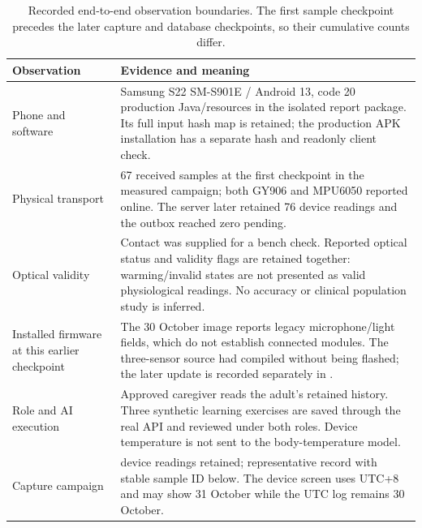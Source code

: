 \begin{table}[H]\small
\caption{Recorded end-to-end observation boundaries. The first sample checkpoint precedes the later capture and database checkpoints, so their cumulative counts differ.}\label{tab:usb-observation}
\begin{tabularx}{\textwidth}{@{}P{38mm}Y@{}}\toprule
Observation & Evidence and meaning\\\midrule
Phone and software & Samsung S22 SM-S901E / Android 13, code 20 production Java/resources in the isolated report package. Its full input hash map is retained; the production APK installation has a separate hash and readonly client check.\\
Physical transport & 67 received samples at the first checkpoint in the measured campaign; both GY906 and MPU6050 reported online. The server later retained 76 device readings and the outbox reached zero pending.\\
Optical validity & Contact was supplied for a bench check. Reported optical status and validity flags are retained together: warming/invalid states are not presented as valid physiological readings. No accuracy or clinical population study is inferred.\\
Installed firmware at this earlier checkpoint & The 30 October image reports legacy microphone/light fields, which do not establish connected modules. The three-sensor source had compiled without being flashed; the later update is recorded separately in .\\
Role and AI execution & Approved caregiver reads the adult's retained history. Three synthetic learning exercises are saved through the real API and reviewed under both roles. Device temperature is not sent to the body-temperature model.\\
Capture campaign & \USBCaptureRecords{} device readings retained; representative record \USBRecordId{} with stable sample ID below. The device screen uses UTC+8 and may show 31 October while the UTC log remains 30 October.\\\bottomrule
\end{tabularx}
\end{table}

